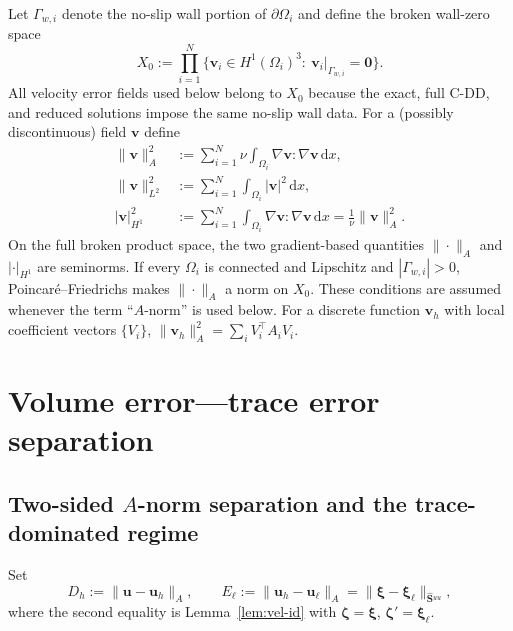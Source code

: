 \documentclass[11pt,a4paper]{article}
\theoremstyle{definition}
\newcommand{\pore}[1]{\Omega_{#1}}
\newcommand{\vel}{\bm{u}}
\newcommand{\Schur}{\mathbf{S}}
\newcommand{\Shatuu}{\widehat{\Schur}{}^{uu}}
\newcommand{\zero}{\bm{0}}
\begin{document}
Let $\Gamma_{w,i}$ denote the no-slip wall portion of
$\partial\pore{i}$ and define the broken wall-zero space
\[
  X_0:=\prod_{i=1}^N
  \{\bm{v}_i\in H^1(\pore{i})^3:\ \bm{v}_i|_{\Gamma_{w,i}}=\zero\}.
\]
All velocity error fields used below belong to $X_0$ because the exact,
full C-DD, and reduced solutions impose the same no-slip wall data.
For a (possibly discontinuous) field $\bm{v}$ define
\begin{align}
  \|\bm{v}\|_A^2 &:= \sum_{i=1}^N \nu\int_{\pore{i}}
                     \nabla\bm{v}:\nabla\bm{v}\,\mathrm{d}x,
                     \label{eq:A-norm} \\[4pt]
  \|\bm{v}\|_{L^2}^2 &:= \sum_{i=1}^N \int_{\pore{i}}
                         |\bm{v}|^2\,\mathrm{d}x, \label{eq:L2-norm} \\[4pt]
  |\bm{v}|_{H^1}^2 &:= \sum_{i=1}^N \int_{\pore{i}}
                        \nabla\bm{v}:\nabla\bm{v}\,\mathrm{d}x
                        = \frac{1}{\nu}\|\bm{v}\|_A^2. \label{eq:H1-semi}
\end{align}
On the full broken product space, the two gradient-based quantities
$\|\cdot\|_A$ and $|\cdot|_{H^1}$ are seminorms.  If every $\pore{i}$ is connected and Lipschitz and
$|\Gamma_{w,i}|>0$, Poincar\'e--Friedrichs makes $\|\cdot\|_A$ a norm
on $X_0$.  These conditions are assumed whenever the term ``$A$-norm''
is used below.  For a discrete function $\bm{v}_h$ with local coefficient
vectors $\{V_i\}$,
$\|\bm{v}_h\|_A^2 = \sum_i V_i^\top A_i V_i$.

\section{Volume error---trace error separation}

\subsection{Two-sided $A$-norm separation and the trace-dominated regime}

Set
\begin{equation}\label{eq:DE}
  D_h := \|\vel - \vel_h\|_A,\qquad
  E_\ell := \|\vel_h - \vel_\ell\|_A
          = \|\bm{\xi} - \bm{\xi}_\ell\|_{\Shatuu},
\end{equation}
where the second equality is Lemma~\ref{lem:vel-id} with
$\bm{\zeta}=\bm{\xi}$, $\bm{\zeta}'=\bm{\xi}_\ell$.
\end{document}
